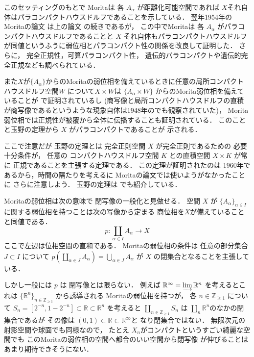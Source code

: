 \documentclass[leqno, a4paper, 12pt]{jsarticle}
\newcommand{\zz}{\mathbb{Z}}
\newcommand{\rr}{\mathbb{R}}
\begin{document}
このセッティングのもとで
Moritaは
各
$A_{\alpha}$
が距離化可能空間であれば
$X$それ自体はパラコンパクトハウスドルフであることを示している．
翌年1954年のMoritaの論文
\cite{MR0069478}
は上の論文
\cite{MR0062423}
の続きであるが，
この中でMoritaは
各
$A_{\alpha}$
がパラコンパクトハウスドルフであることと
$X$
それ自体もパラコンパクトハウスドルフが同値というふうに弱位相とパラコンパクト性の関係を改良して証明した．
さらに，
完全正規性，可算パラコンパクト性，
遺伝的パラコンパクトや遺伝的完全正規なども調べられている．

また$X$が$\{A_{\alpha}\}$からのMoritaの弱位相を備えているときに任意の局所コンパクトハウスドルフ空間$W$
について$X\times W$は
$\{A_{\alpha}\times W\}$
からのMorita弱位相を備えていることが
\cite{MR0062423}で証明されているし
(商写像と局所コンパクトハウスドルフの直積が商写像であるというような現象自体は1948年の\cite[Lemma 4]{MR0029503}でも観察されていた)，
Morita弱位相では正規性が被覆から全体に伝播することも証明されている．
このことと玉野の定理から
$X$
がパラコンパクトであることが
示される．

ここで注意だが
玉野の定理とは
完全正則空間
$X$
が完全正則であるための
必要十分条件が，
任意の
コンパクトハウスドルフ空間
$K$
との直積空間
$X\times K$
が常に
正規であることを主張する定理である．
この定理が証明されたのは
1960年であるから，時間の隔たりを考えるに
Moritaの論文では使いようがなかったことに
さらに注意しよう．
玉野の定理は
\cite{Den4}
でも紹介している．

Moritaの弱位相は次の意味で
閉写像の一般化と見做せる．
空間
$X$
が
$\{A_{\alpha}\}_{\alpha\in I}$
に関する弱位相を持つことは次の写像から定まる
商位相を$X$が備えていることと同値である．
\[
p\colon \coprod_{\alpha\in I}A_{\alpha}\to X
\]
ここで左辺は位相空間の直和である．
Moritaの弱位相の条件は
任意の部分集合
$J\subset I$
について
$p\left(\coprod_{\alpha \in J}A_{\alpha}\right)
=\bigcup_{\alpha\in J}A_{\alpha}$
が
$X$
の閉集合となることを主張している．

しかし一般には
$p$
は
閉写像とは限らない．
例えば
$\rr^{\infty}=\varinjlim \rr^{n}$
を考えるとこれは
$\{\rr^{n}\}_{n\in \zz_{\ge 1}}$
から誘導される
Moritaの弱位相を持つが，
各
$n\in \zz_{\ge 1}$
について
$S_{n}=[2^{-n}, 1-2^{-n}]\subset \rr\subset \rr^{n}$
を考えると
$\coprod_{n\in \zz_{\ge 1}}S_{n}$
は
$\coprod_{n}\rr^{n}$のなかの閉集合であるが
その像は
$(0, 1) \subset \rr\subset  \rr^{\infty}$と
なり閉集合ではない．
無限次元の射影空間や球面でも同様なので，
たとえ
$X_{n}$がコンパクトというすごい綺麗な空間でも
このMoritaの弱位相の空間へ都合のいい空間から閉写像
が伸びることはあまり期待できそうにない．
\end{document}
